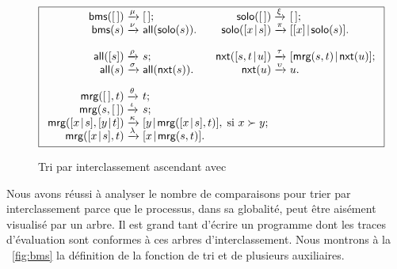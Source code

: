 \begin{figure}[H]
\begin{equation*}
\boxed{%
\begin{array}{r@{\;}l@{\;}lr@{\;}l@{\;}l}
  \fun{bms}(\el) & \xrightarrow{\smash{\mu}} & \el;
& \fun{solo}(\el) & \xrightarrow{\smash{\xi}} & \el;\\
  \fun{bms}(s) & \xrightarrow{\smash{\nu}}
               & \fun{all}(\fun{solo}(s)).
& \fun{solo}(\cons{x}{s}) & \xrightarrow{\smash{\pi}}
                          & \cons{[x]}{\fun{solo}(s)}.\\
\\
  \fun{all}([s]) & \xrightarrow{\smash{\rho}} & s;
& \fun{nxt}(\cons{s,t}{u}) & \xrightarrow{\smash{\tau}}
                         & \cons{\fun{mrg}(s,t)}{\fun{nxt}(u)};\\
  \fun{all}(s) & \xrightarrow{\smash{\sigma}}
               & \fun{all}(\fun{nxt}(s)).
& \fun{nxt}(u) & \xrightarrow{\smash{\upsilon}} & u.\\
\\
\fun{mrg}(\el,t)         & \xrightarrow{\smash{\theta}} & t;\\
\fun{mrg}(s,\el)         & \xrightarrow{\smash{\iota}} & s;\\
\fun{mrg}(\cons{x}{s},\cons{y}{t}) & \xrightarrow{\smash{\kappa}}
& \multicolumn{4}{@{}l}{\cons{y}{\fun{mrg}(\cons{x}{s},t)},
\;\text{si \(x \succ y\);}}\\
\fun{mrg}(\cons{x}{s},t) & \xrightarrow{\smash{\lambda}}
                         & \cons{x}{\fun{mrg}(s,t)}.
\end{array}}
\end{equation*}
\caption{Tri par interclassement ascendant avec }
\label{fig:bms}
\end{figure}


Nous avons réussi à analyser le nombre de comparaisons pour trier par
interclassement parce que le processus, dans sa globalité, peut être
aisément visualisé par un arbre. Il est grand tant d'écrire un programme dont
les traces d'évaluation sont conformes à ces arbres
d'interclassement. Nous montrons à la \fig~\vref{fig:bms} la
définition de la fonction de tri  et
de plusieurs auxiliaires.

